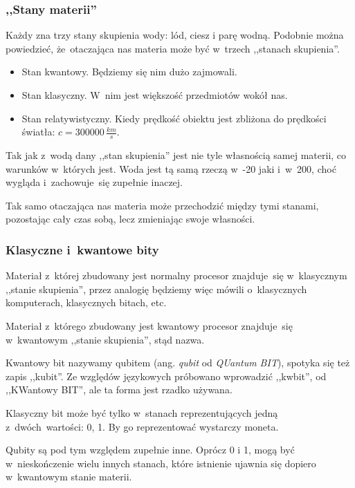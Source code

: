 \documentclass[10pt,t]{beamer}
\begin{document}
\begin{frame}
  \frametitle{,,Stany materii''}


  Każdy zna trzy stany skupienia wody: lód, ciesz i parę wodną.
  Podobnie można powiedzieć, że~otaczająca nas materia może być
  w~trzech ,,stanach skupienia''.

  \begin{itemize}
  \item Stan kwantowy. Będziemy się nim dużo zajmowali.

  \item Stan klasyczny. W~nim jest większość przedmiotów wokół nas.

  \item Stan relatywistyczny. Kiedy prędkość obiektu jest zbliżona do
    prędkości światła: $c = 3 00 000 \, \frac{ \si{km} }{ \si{s} }$.

  \end{itemize}

  Tak jak z~wodą dany ,,stan skupienia'' jest nie tyle własnością
  samej materii, co warunków w~których jest. Woda jest tą samą rzeczą
  w~-20\textcelsius{ } jaki i~w~200\textcelsius, choć wygląda
  i~zachowuje~się zupełnie inaczej.

  Tak samo otaczająca nas materia może przechodzić między tymi
  stanami, pozostając cały czas sobą, lecz zmieniając swoje własności.

\end{frame}





\begin{frame}
  \frametitle{Klasyczne i~kwantowe bity}


  Materiał z~której zbudowany jest normalny procesor znajduje~się
  w~klasycznym ,,stanie skupienia'', przez analogię będziemy więc
  mówili o~klasycznych komputerach, klasycznych bitach, etc.

  Materiał z~którego zbudowany jest kwantowy procesor znajduje~się
  w~kwantowym ,,stanie skupienia'', stąd nazwa.

  Kwantowy bit nazywamy \alert{qubitem} (ang. \emph{qubit} od
  \emph{QUantum BIT}), spotyka się też zapis ,,kubit''. Ze względów
  językowych próbowano wprowadzić ,,kwbit'', od ,,KWantowy BIT'', ale
  ta forma jest rzadko używana.

  Klasyczny bit może być tylko w~stanach reprezentujących jedną
  z~dwóch~wartości: 0, 1. By go reprezentować wystarczy moneta.

  Qubity są pod tym względem zupełnie inne. Oprócz 0 i 1, mogą być
  w~nieskończenie wielu innych stanach, które istnienie ujawnia się
  dopiero w~kwantowym stanie materii.

\end{frame}
\end{document}
